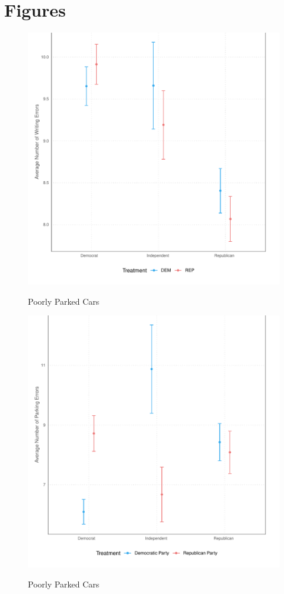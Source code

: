 \documentclass[12pt, letterpaper]{article}
\begin{document}
\clearpage
\section{Figures}

\begin{figure}[!htbp]
\centering
\caption{Poorly Parked Cars}
\includegraphics[scale=.6]{../figs/error.pdf}
\label{fig:mistakes_rep}
\end{figure}


\begin{figure}[!htbp]
\centering
\caption{Poorly Parked Cars}
\includegraphics[scale=.6]{../figs/parking.pdf}
\label{fig:mistakes_rep}
\end{figure}
\end{document}
